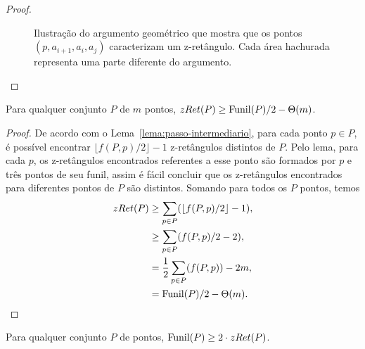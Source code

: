 \begin{proof}
\begin{figure}
        \caption{Ilustração do argumento geométrico que mostra que os pontos $(p,a_{i+1},a_i,a_j)$ caracterizam um z-retângulo. Cada área hachurada representa uma parte diferente do argumento.}
        \label{fig:representacao-areas}
    \end{figure}
\end{proof}

\begin{lemma} \label{lemma:zrets-funil}
    Para qualquer conjunto $P$ de $m$ pontos, $zRet(P) \geq \mathrm{Funil}(P)/2 - \Theta(m)$.
\end{lemma}

\begin{proof}
    De acordo com o Lema~\ref{lema:passo-intermediario}, para cada ponto $p \in P$, é possível encontrar $\lfloor f(P,p)/2 \rfloor - 1$ z-retângulos distintos de $P$. Pelo lema, para cada $p$, os z-retângulos encontrados referentes a esse ponto são formados por $p$ e três pontos de seu funil, assim é fácil concluir que os z-retângulos encontrados para diferentes pontos de $P$ são distintos. Somando para todos os $P$ pontos, temos
    \begin{align}
        zRet(P) &\geq \sum_{p \in P} (\lfloor f(P,p)/2 \rfloor - 1) , \notag \\
        &\geq \sum_{p \in P} (f(P,p)/2 - 2) , \notag \\
        &= \frac{1}{2} \sum_{p \in P} (f(P,p)) - 2m , \notag \\
        &= \mathrm{Funil}(P)/2 - \Theta(m). \notag
    \end{align}
\end{proof}

\begin{lemma} \label{lemma:funil-zrets}
    Para qualquer conjunto $P$ de pontos, $\mathrm{Funil}(P) \geq 2 \cdot zRet(P)$.
\end{lemma}

